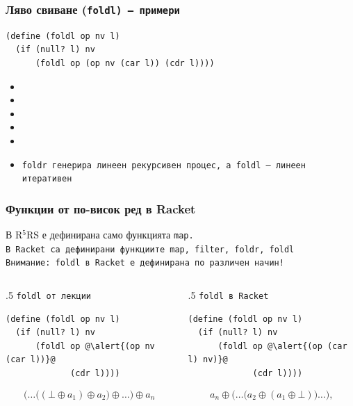 \documentclass[alsotrans,beameroptions={aspectratio=169}]{beamerswitch}
\begin{document}
\begin{frame}[fragile,label=foldlex]
  \frametitle{Ляво свиване (\tt{foldl}) --- примери}

\begin{lstlisting}
(define (foldl op nv l)
  (if (null? l) nv
      (foldl op (op nv (car l)) (cdr l))))
\end{lstlisting}
  \pause
  \small
  \begin{itemize}[<+->]
  \item {}
  \item {}
  \item {}
  \item {}
  \item {}
  \item \tt{foldr} генерира линеен рекурсивен процес, а \tt{foldl} --- линеен итеративен
  \end{itemize}
\end{frame}

\begin{frame}[fragile]
  \frametitle{Функции от по-висок ред в Racket}

  В R$^5$RS е дефинирана само функцията \tt{map}.\\
  В Racket са дефинирани функциите \tt{map}, \tt{filter}, \tt{foldr}, \tt{foldl}\\[2ex]
  \pause
  \alert{Внимание: \tt{foldl} в Racket е дефинирана по различен начин!}\\[2ex]
  \begin{columns}[T,onlytextwidth]
    \small
    \begin{column}{.5\textwidth}
      \tt{foldl} от лекции\\[2ex]
\begin{lstlisting}
(define (foldl op nv l)
  (if (null? l) nv
      (foldl op @\alert{(op nv (car l))}@
             (cdr l))))
\end{lstlisting}
      \begin{equation*}
        \Big(\ldots\big((\bot \oplus a_1) \oplus a_2\big) \oplus \ldots\Big) \oplus a_n
      \end{equation*}
    \end{column}
    \begin{column}{.5\textwidth}
      \tt{foldl} в Racket\\[2ex]
\begin{lstlisting}
(define (foldl op nv l)
  (if (null? l) nv
      (foldl op @\alert{(op (car l) nv)}@
             (cdr l))))
\end{lstlisting}
      \begin{equation*}
        a_n \oplus \Big(\ldots \big(a_2 \oplus (a_1 \oplus \bot)\big)\ldots\Big),
      \end{equation*}
    \end{column}
  \end{columns}
\end{frame}
\end{document}
